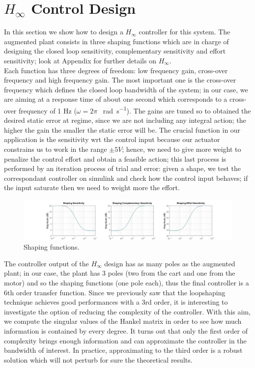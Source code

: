 \section{$H_{\infty}$ Control Design}
In this section we show how to design a $H_{\infty}$ controller for this system. The augmented plant consists in three shaping functions which are in charge of designing the closed loop sensitivity, complementary sensitivity and effort sensitivity; look at Appendix for further details on $H_\infty$.\\

Each function has three degrees of freedom: low frequency gain, cross-over frequency and high frequency gain. The most important one is the cross-over frequency which defines the closed loop bandwidth of the system; in our case, we are aiming at a response time of about one second which corresponds to a cross-over frequency of 1 Hz ($\omega =2\pi $ \SI{}{\radian \per \second}). The gains are tuned so to obtained the desired static error at regime, since we are not including any integral action; the higher the gain the smaller the static error will be. The crucial function in our application is the sensitivity wrt the control input because our actuator constrains us to work in the range $\pm 5V$; hence, we need to give more weight to penalize the control effort and obtain a feasible action; this last process is performed by an iteration process of trial and error: given a shape, we test the correspondant controller on simulink and check how the control input behaves; if the input saturate then we need to weight more the effort.\\

\begin{figure}[h]
\centering
\includegraphics[width=1\textwidth]{img/hinf_shapes.jpg}
\caption{Shaping functions.}
\end{figure}

The controller output of the $H_{\infty}$ design has as many poles as the augmented plant; in our case, the plant has 3 poles (two from the cart and one from the motor) and so the shaping functions (one pole each), thus the final controller is a 6th order transfer function. Since we previously saw that the loopshaping technique achieves good performances with a 3rd order, it is interesting to investigate the option of reducing the complexity of the controller. With this aim, we compute the singular values of the Hankel matrix in order to see how much information is contained by every degree. It turns out that only the first order of complexity brings enough information and can approximate the controller in the bandwidth of interest. In practice, approximating to the third order is a robust solution which will not perturb for sure the theoretical results.\\

